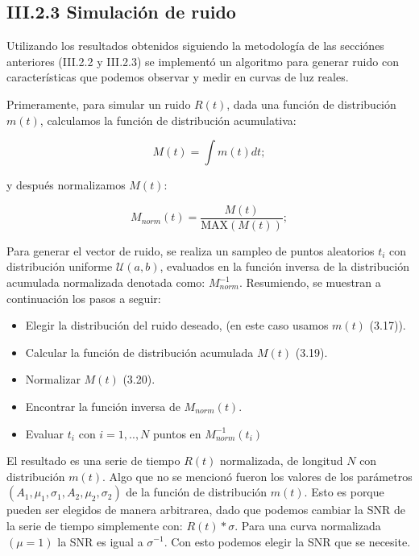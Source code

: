 \subsection*{III.2.3 Simulación de ruido}

Utilizando los resultados obtenidos siguiendo la metodología de las secciónes anteriores (III.2.2 y III.2.3) se implementó un algoritmo para generar ruido con características que podemos observar y medir en curvas de luz reales.

Primeramente, para simular un ruido $R(t)$, dada una función de distribución $m(t)$, calculamos la función de distribución acumulativa:

\begin{equation}
  M(t)= \int m(t)dt;
\end{equation}

\noindent y después normalizamos $M(t)$:

\begin{equation}
  M_{norm}(t)= \dfrac{M(t)}{\mbox{MAX}(M(t))};
\end{equation}

Para generar el vector de ruido, se realiza un sampleo de puntos aleatorios $t_{i}$ con distribución uniforme $\mathcal{U}(a,b)$, evaluados en la función inversa de la distribución acumulada normalizada denotada como: $M^{-1}_{norm}$. Resumiendo, se muestran a continuación los pasos a seguir:

\begin{itemize}
  \item Elegir la distribución del ruido deseado, (en este caso usamos $m(t)$ (3.17)).
  \item Calcular la función de distribución acumulada $M(t)$ (3.19).
  \item Normalizar $M(t)$ (3.20).
  \item Encontrar la función inversa de $M_{norm}(t)$.
  \item Evaluar $t_{i}$ con $i=1,..,N$ puntos en $M^{-1}_{norm}(t_{i})$
\end{itemize}

El resultado es una serie de tiempo $R(t)$ normalizada, de longitud $N$ con distribución $m(t)$. Algo que no se mencionó fueron los valores de los parámetros $(A_{1},\mu_{1},\sigma_{1},A_{2},\mu_{2},\sigma_{2})$ de la función de distribución $m(t)$. Esto es porque pueden ser elegidos de manera arbitrarea, dado que podemos cambiar la SNR de la serie de tiempo simplemente con: $R(t)*\sigma$. Para una curva normalizada $(\mu=1)$ la SNR es igual a $\sigma^{-1}$. Con esto podemos elegir la SNR que se necesite.

